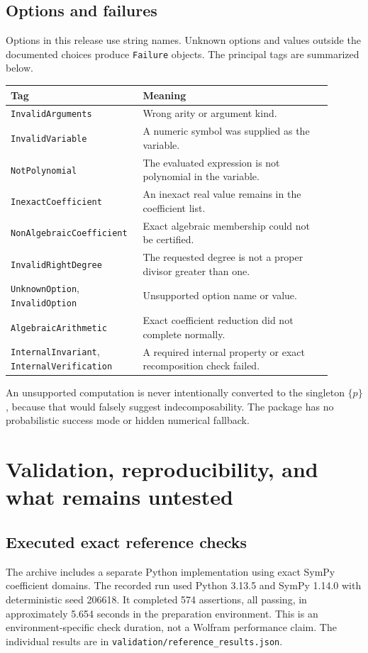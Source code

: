 \documentclass[11pt,letterpaper]{article}
\theoremstyle{definition}
\theoremstyle{remark}
\newcommand{\wt}[1]{\texttt{#1}}
\begin{document}
\subsection{Options and failures}
Options in this release use string names. Unknown options and values
outside the documented choices produce \wt{Failure} objects.
The principal tags are summarized below.
\begin{center}
\begin{tabular}{>{\raggedright\arraybackslash}p{0.33\linewidth}>{\raggedright\arraybackslash}p{0.57\linewidth}}
\toprule
\textbf{Tag} & \textbf{Meaning}\\
\midrule
\wt{InvalidArguments} & Wrong arity or argument kind.\\
\wt{InvalidVariable} & A numeric symbol was supplied as the variable.\\
\wt{NotPolynomial} & The evaluated expression is not polynomial in the variable.\\
\wt{InexactCoefficient} & An inexact real value remains in the coefficient list.\\
\wt{NonAlgebraicCoefficient} & Exact algebraic membership could not be certified.\\
\wt{InvalidRightDegree} & The requested degree is not a proper divisor greater than one.\\
\wt{UnknownOption}, \wt{InvalidOption} & Unsupported option name or value.\\
\wt{AlgebraicArithmetic} & Exact coefficient reduction did not complete normally.\\
\wt{InternalInvariant}, \wt{InternalVerification} & A required internal property or exact recomposition check failed.\\
\bottomrule
\end{tabular}
\end{center}
An unsupported computation is never intentionally converted to the
singleton $\{p\}$, because that would falsely suggest indecomposability.
The package has no probabilistic success mode or hidden numerical
fallback.

\section{Validation, reproducibility, and what remains untested}
\label{sec:validation}

\subsection{Executed exact reference checks}
The archive includes a separate Python implementation using exact SymPy
coefficient domains. The recorded run used Python 3.13.5 and SymPy 1.14.0
with deterministic seed 206618. It completed 574 assertions, all passing,
in approximately 5.654 seconds in the preparation environment. This is
an environment-specific check duration, not a Wolfram performance claim.
The individual results are in \wt{validation/reference\_results.json}.
\end{document}
